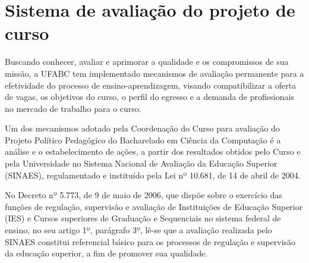 \section {Sistema de avaliação do projeto de curso}

Buscando conhecer, avaliar e aprimorar a qualidade e os compromissos de sua
missão, a UFABC tem implementado mecanismos de avaliação permanente para a
efetividade do processo de ensino-aprendizagem, visando compatibilizar a oferta
de vagas, os objetivos do curso, o perfil do egresso e a demanda de
profissionais no mercado de trabalho para o curso.

Um dos mecanismos adotado pela Coordenação do Curso para avaliação do Projeto
Político Pedagógico do Bacharelado em Ciência da Computação é a análise e o
estabelecimento de ações, a partir dos resultados obtidos pelo Curso e pela
Universidade no Sistema Nacional de Avaliação da Educação Superior (SINAES),
regulamentado e instituído pela Lei nº 10.681, de 14 de abril de 2004.

No Decreto nº 5.773, de 9 de maio de 2006, que dispõe sobre o exercício das
funções de regulação, supervisão e avaliação de Instituições de Educação
Superior (IES) e Cursos superiores de Graduação e Sequenciais no sistema
federal de ensino, no seu artigo 1º, parágrafo 3º, lê-se que a avaliação
realizada pelo SINAES constitui referencial básico para os processos de
regulação e supervisão da educação superior, a fim de promover sua qualidade.

